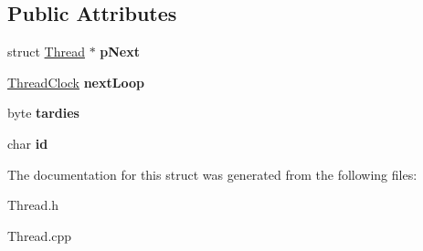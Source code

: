 \subsection*{Public Attributes}
\begin{DoxyCompactItemize}
\item 
\hypertarget{structfirestep_1_1_thread_aa8b92a83425f701377f1bd043c8d2c2e}{struct \hyperlink{structfirestep_1_1_thread}{Thread} $\ast$ {\bfseries p\+Next}}\label{structfirestep_1_1_thread_aa8b92a83425f701377f1bd043c8d2c2e}

\item 
\hypertarget{structfirestep_1_1_thread_a6454f4d8c71fdfed974294d9ed67c4b7}{\hyperlink{unionfirestep_1_1_thread_clock}{Thread\+Clock} {\bfseries next\+Loop}}\label{structfirestep_1_1_thread_a6454f4d8c71fdfed974294d9ed67c4b7}

\item 
\hypertarget{structfirestep_1_1_thread_a1374fd754ad90ed5085d9a8e594a12cf}{byte {\bfseries tardies}}\label{structfirestep_1_1_thread_a1374fd754ad90ed5085d9a8e594a12cf}

\item 
\hypertarget{structfirestep_1_1_thread_aea421383327277a6975fc5893b747eca}{char {\bfseries id}}\label{structfirestep_1_1_thread_aea421383327277a6975fc5893b747eca}

\end{DoxyCompactItemize}


The documentation for this struct was generated from the following files\+:\begin{DoxyCompactItemize}
\item 
Thread.\+h\item 
Thread.\+cpp\end{DoxyCompactItemize}
